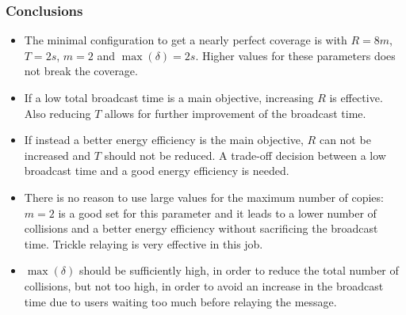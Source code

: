 \subsubsection{Conclusions}\label{subsubsec:ldconclusions}

\begin{itemize}
	\item The minimal configuration to get a nearly perfect coverage is with
		\(R\!=\!8m\), \(T\!=\!2s\), \(m\!=\!2\) and
		\(\max(\delta)\!=\!2s\). Higher values for these parameters does
		not break the coverage.
	\item If a low total broadcast time is a main objective, increasing
		\(R\) is effective. Also reducing \(T\) allows for further
		improvement of the broadcast time.
	\item If instead a better energy efficiency is the main objective, \(R\)
		can not be increased and \(T\) should not be reduced. A
		trade-off decision between a low broadcast time and a good
		energy efficiency is needed.
	\item There is no reason to use large values for the maximum number of
		copies: \(m\!=\!2\) is a good set for this parameter and it
		leads to a lower number of collisions and a better energy
		efficiency without sacrificing the broadcast time. Trickle
		relaying is very effective in this job.
	\item \(\max(\delta)\) should be sufficiently high, in order to reduce
		the total number of collisions, but not too high, in order to
		avoid an increase in the broadcast time due to users waiting too
		much before relaying the message.
\end{itemize}

